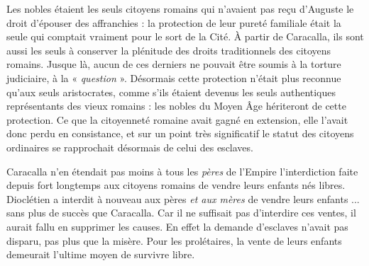  Les nobles étaient les seuls citoyens romains qui n'avaient pas reçu d'Auguste le droit d'épouser des affranchies : la protection de leur pureté familiale était la seule qui comptait vraiment pour le sort de la Cité. À partir de Caracalla, ils sont aussi les seuls à conserver la plénitude des droits traditionnels des citoyens romains. Jusque là, aucun de ces derniers ne pouvait être soumis à la torture judiciaire, à la « \emph{question} ». Désormais cette protection n'était plus reconnue qu'aux seuls aristocrates, comme s'ils étaient devenus les seuls authentiques représentants des vieux romains : les nobles du Moyen Âge hériteront de cette protection. Ce que la citoyenneté romaine avait gagné en extension, elle l'avait donc perdu en consistance, et sur un point très significatif le statut des citoyens ordinaires se rapprochait désormais de celui des esclaves.

 Caracalla n'en étendait pas moins à tous les \emph{pères} de l'Empire l'interdiction faite depuis fort longtemps aux citoyens romains de vendre leurs enfants nés libres. Dioclétien a interdit à nouveau aux pères \emph{et aux mères} de vendre leurs enfants ... sans plus de succès que Caracalla. Car il ne suffisait pas d'interdire ces ventes, il aurait fallu en supprimer les causes. En effet la demande d'esclaves n'avait pas disparu, pas plus que la misère. Pour les prolétaires, la vente de leurs enfants demeurait l'ultime moyen de survivre libre.
 
 
